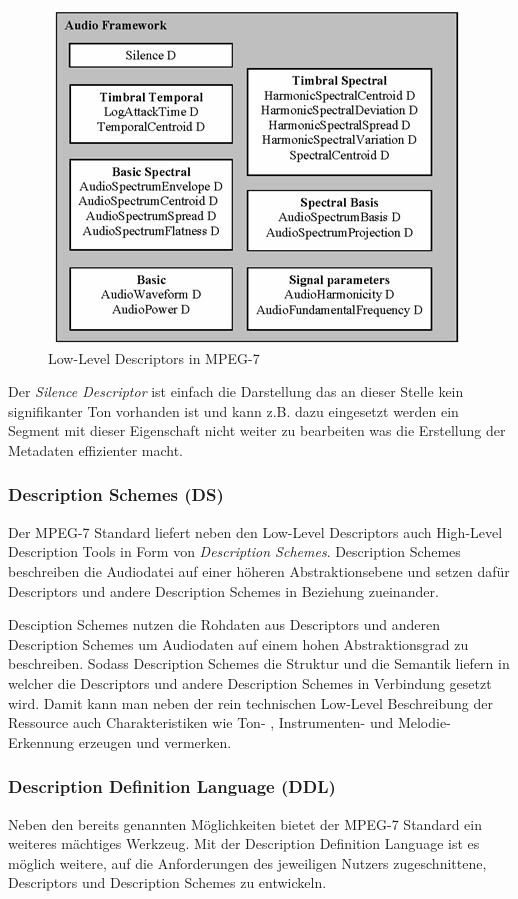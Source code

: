 \begin{figure}[h]
\includegraphics [scale=0.65]{image061.jpg}
\caption {Low-Level Descriptors in MPEG-7}
\end{figure}

Der \emph{Silence Descriptor} ist einfach die Darstellung das an dieser Stelle kein signifikanter Ton vorhanden ist und kann z.B. dazu eingesetzt werden ein Segment mit dieser Eigenschaft nicht weiter zu bearbeiten was die Erstellung der Metadaten effizienter macht.

	\subsubsection{Description Schemes (DS)}
		Der MPEG-7 Standard liefert neben den Low-Level Descriptors auch High-Level Description Tools in Form von \emph{Description Schemes}. Description Schemes beschreiben die Audiodatei auf einer höheren Abstraktionsebene und setzen dafür Descriptors und andere Description Schemes in Beziehung zueinander.
		
		Desciption Schemes nutzen die Rohdaten aus Descriptors und anderen Description Schemes um Audiodaten auf einem hohen Abstraktionsgrad zu beschreiben. Sodass Description Schemes die Struktur und die Semantik liefern in welcher die Descriptors und andere Description Schemes in Verbindung gesetzt wird. Damit kann man neben der rein technischen Low-Level Beschreibung der Ressource auch Charakteristiken wie Ton- , Instrumenten- und Melodie-Erkennung erzeugen und vermerken. 
				
	\subsubsection{Description Definition Language (DDL)}
Neben den bereits genannten Möglichkeiten bietet der MPEG-7 Standard ein weiteres mächtiges Werkzeug. Mit der Description Definition Language ist es möglich weitere, auf die Anforderungen des jeweiligen Nutzers zugeschnittene, Descriptors und Description Schemes zu entwickeln.

